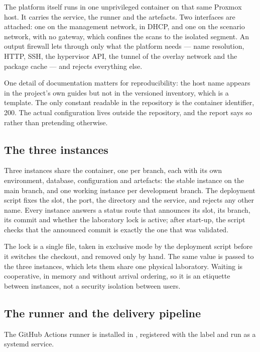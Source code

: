 The platform itself runs in one unprivileged container on that same Proxmox host.
It carries the service, the runner and the artefacts. Two interfaces are attached:
one on the management network, in DHCP, and one on the scenario network, with no
gateway, which confines the scans to the isolated segment. An output firewall lets
through only what the platform needs --- name resolution, HTTP, SSH, the hypervisor
API, the tunnel of the overlay network and the package cache --- and rejects
everything else.

One detail of documentation matters for reproducibility: the host name appears in
the project's own guides but not in the versioned inventory, which is a template.
The only constant readable in the repository is the container identifier, 200. The
actual configuration lives outside the repository, and the report says so rather
than pretending otherwise.

\subsection{The three instances}

Three instances share the container, one per branch, each with its own environment,
database, configuration and artefacts: the stable instance on the main branch, and
one working instance per development branch. The deployment script fixes the slot,
the port, the directory and the service, and rejects any other name. Every
instance answers a status route that announces its slot, its branch, its commit and
whether the laboratory lock is active; after start-up, the script checks that the
announced commit is exactly the one that was validated.

The lock is a single file, taken in exclusive mode by the deployment script before
it switches the checkout, and removed only by hand. The same value is passed to
the three instances, which lets them share one physical laboratory. Waiting is cooperative, in memory and
without arrival ordering, so it is an etiquette between instances, not a security
isolation between users.

\subsection{The runner and the delivery pipeline}

The GitHub Actions runner is installed in , registered
with the label  and run as a systemd service.

